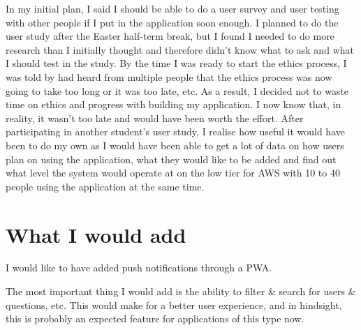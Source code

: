 In my initial plan, I said I should be able to do a user survey and user testing with other people if I put in the application soon enough. I planned to do the user study after the Easter half-term break, but I found I needed to do more research than I initially thought and therefore didn't know what to ask and what I should test in the study. By the time I was ready to start the ethics process, I was told by had heard from multiple people that the ethics process was now going to take too long or it was too late, etc. As a result, I decided not to waste time on ethics and progress with building my application. I now know that, in reality, it wasn't too late and would have been worth the effort. After participating in another student's user study, I realise how useful it would have been to do my own as I would have been able to get a lot of data on how users plan on using the application, what they would like to be added and find out what level the system would operate at on the low tier for AWS with 10 to 40 people using the application at the same time.

\section{What I would add}
I would like to have added push notifications through a PWA.

The most important thing I would add is the ability to filter & search for users & questions, etc. This would make for a better user experience, and in hindsight, this is probably an expected feature for applications of this type now.
